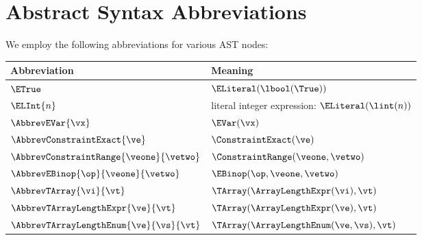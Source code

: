 \section{Abstract Syntax Abbreviations\label{sec:AbstractSyntaxAbreviations}}
We employ the following abbreviations for various AST nodes:
\begin{center}
\begin{tabular}{ll}
\hline
\textbf{Abbreviation} & \textbf{Meaning}
\hypertarget{def-etrue}{}\\
\hline
$\ETrue$ & $\ELiteral(\lbool(\True))$ \hypertarget{def-elint}{}\\
$\ELInt{n}$ & literal integer expression: $\ELiteral(\lint(n))$
\hypertarget{def-abbrevevar}{}\\
$\AbbrevEVar{\vx}$ & $\EVar(\vx)$
\hypertarget{def-abbrevconstraintexact}{}\\
$\AbbrevConstraintExact{\ve}$ & $\ConstraintExact(\ve)$
\hypertarget{def-abbrevconstraintrange}{}\\
$\AbbrevConstraintRange{\veone}{\vetwo}$ & $\ConstraintRange(\veone, \vetwo)$ \hypertarget{def-abbrevebinop}{}\\
$\AbbrevEBinop{\op}{\veone}{\vetwo}$ & $\EBinop(\op, \veone, \vetwo)$ \hypertarget{def-abbrevtarray}{}\\
$\AbbrevTArray{\vi}{\vt}$ & $\TArray(\ArrayLengthExpr(\vi), \vt)$ \hypertarget{def-abbrevtarraylengthexpr}{}\\
$\AbbrevTArrayLengthExpr{\ve}{\vt}$ & $\TArray(\ArrayLengthExpr(\ve), \vt)$ \hypertarget{def-abbrevtarraylengthenum}{}\\
$\AbbrevTArrayLengthEnum{\ve}{\vs}{\vt}$ & $\TArray(\ArrayLengthEnum(\ve, \vs), \vt)$\\
\hline
\end{tabular}
\end{center}
